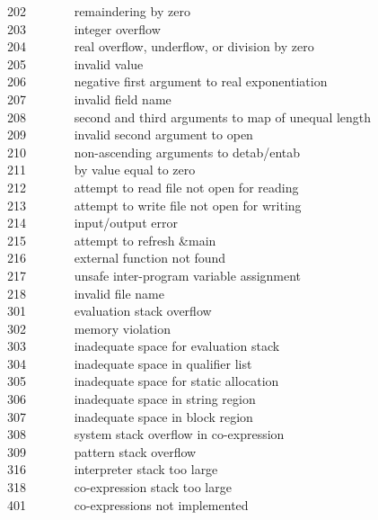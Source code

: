202 \ \ \ \ \ \ \ remaindering by zero\\
203 \ \ \ \ \ \ \ integer overflow\\
204 \ \ \ \ \ \ \ real overflow, underflow, or division by zero\\
205 \ \ \ \ \ \ \ invalid value\\
206 \ \ \ \ \ \ \ negative first argument to real exponentiation\\
207 \ \ \ \ \ \ \ invalid field name\\
208 \ \ \ \ \ \ \ second and third arguments to map of unequal
length\\
209 \ \ \ \ \ \ \ invalid second argument to open\\
210 \ \ \ \ \ \ \ non-ascending arguments to detab/entab\\
211 \ \ \ \ \ \ \ by value equal to zero\\
212 \ \ \ \ \ \ \ attempt to read file not open for reading\\
213 \ \ \ \ \ \ \ attempt to write file not open for writing\\
214 \ \ \ \ \ \ \ input/output error\\
215 \ \ \ \ \ \ \ attempt to refresh \&main\\
216 \ \ \ \ \ \ \ external function not found\\
217 \ \ \ \ \ \ \ unsafe inter-program variable assignment\\
218 \ \ \ \ \ \ \ invalid file name\\
301 \ \ \ \ \ \ \ evaluation stack overflow\\
302 \ \ \ \ \ \ \ memory violation\\
303 \ \ \ \ \ \ \ inadequate space for evaluation stack\\
304 \ \ \ \ \ \ \ inadequate space in qualifier list\\
305 \ \ \ \ \ \ \ inadequate space for static allocation\\
306 \ \ \ \ \ \ \ inadequate space in string region\\
307 \ \ \ \ \ \ \ inadequate space in block region\\
308 \ \ \ \ \ \ \ system stack overflow in co-expression\\
309 \ \ \ \ \ \ \ pattern stack overflow\\
316 \ \ \ \ \ \ \ interpreter stack too large\\
318 \ \ \ \ \ \ \ co-expression stack too large\\
401 \ \ \ \ \ \ \ co-expressions not implemented\\
